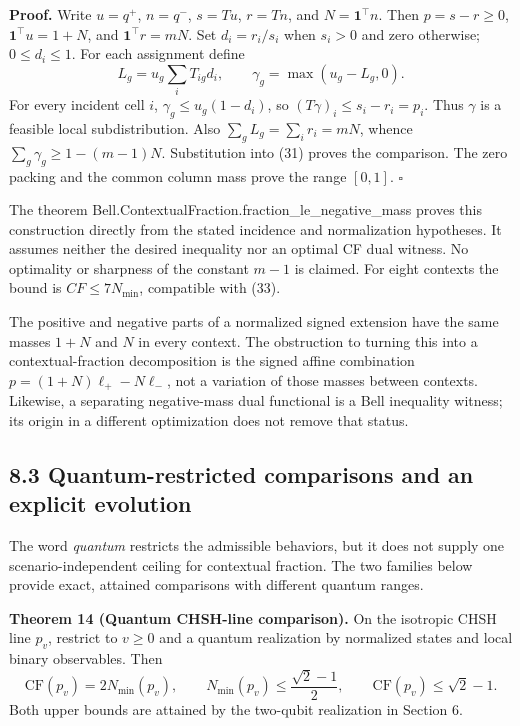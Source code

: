\documentclass[
]{article}
\begin{document}
\textbf{Proof.} Write \(u=q^+\), \(n=q^-\), \(s=Tu\), \(r=Tn\), and \(N=\mathbf1^\top n\). Then \(p=s-r\ge0\), \(\mathbf1^\top u=1+N\), and \(\mathbf1^\top r=mN\). Set \(d_i=r_i/s_i\) when \(s_i>0\) and zero otherwise; \(0\le d_i\le1\). For each assignment define
\[
L_g=u_g\sum_iT_{ig}d_i,\qquad
\gamma_g=\max(u_g-L_g,0).
\]
For every incident cell \(i\), \(\gamma_g\le u_g(1-d_i)\), so \((T\gamma)_i\le s_i-r_i=p_i\). Thus \(\gamma\) is a feasible local subdistribution. Also \(\sum_g L_g=\sum_i r_i=mN\), whence \(\sum_g\gamma_g\ge1-(m-1)N\). Substitution into (31) proves the comparison. The zero packing and the common column mass prove the range \([0,1]\). \(\square\)

The theorem Bell.ContextualFraction.fraction\_le\_negative\_mass proves this construction directly from the stated incidence and normalization hypotheses. It assumes neither the desired inequality nor an optimal CF dual witness. No optimality or sharpness of the constant \(m-1\) is claimed. For eight contexts the bound is \(CF\le7N_{\min}\), compatible with (33).

The positive and negative parts of a normalized signed extension have the same masses \(1+N\) and \(N\) in every context. The obstruction to turning this into a contextual-fraction decomposition is the signed affine combination \(p=(1+N)\ell_+-N\ell_-\), not a variation of those masses between contexts. Likewise, a separating negative-mass dual functional is a Bell inequality witness; its origin in a different optimization does not remove that status.

\subsection{8.3 Quantum-restricted comparisons and an explicit evolution}\label{quantum-restricted-comparisons-and-an-explicit-evolution}

The word \emph{quantum} restricts the admissible behaviors, but it does not supply one scenario-independent ceiling for contextual fraction. The two families below provide exact, attained comparisons with different quantum ranges.

\textbf{Theorem 14 (Quantum CHSH-line comparison).} On the isotropic CHSH line \(p_v\), restrict to \(v\ge0\) and a quantum realization by normalized states and local binary observables. Then
\[
\mathrm{CF}(p_v)=2N_{\min}(p_v),\qquad
N_{\min}(p_v)\le\frac{\sqrt2-1}{2},\qquad
\mathrm{CF}(p_v)\le\sqrt2-1.
\tag{35}
\]
Both upper bounds are attained by the two-qubit realization in Section 6.
\end{document}
